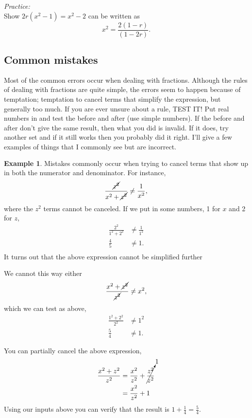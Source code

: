\documentclass[final,a4paper,12pt]{article}
\theoremstyle{definition}
\newtheorem{example}{Example}[section]
\begin{document}
{\it Practice:} \\
Show $2 r (x^2 - 1) = x^2 - 2$ can be written as
\begin{equation}
    x^2 = \frac{2(1 - r)}{(1 - 2r)} .
\end{equation}

\subsection{Common mistakes}
Most of the common errors occur when dealing with fractions.  Although the rules
of dealing with fractions are quite simple, the errors seem to happen because of
temptation; temptation to cancel terms that simplify the expression, but
generally too much.  If you are ever unsure about a rule, TEST IT!  Put real
numbers in and test the before and after (use simple numbers).  If the before
and after don't give the same result, then what you did is invalid.  If it does,
try another set and if it still works then you probably did it right.  I'll give
a few examples of things that I commonly see but are incorrect.

\begin{example}
    Mistakes commonly occur when trying to cancel terms that show up in both the
    numerator and denominator.  For instance,
    \begin{equation*}
        \frac{\cancel{z^2}}{x^2 + \cancel{z^2}} \neq \frac{1}{x^2} ,
    \end{equation*}
    where the $z^2$ terms cannot be canceled.  If we put in some numbers, 1 for
    $x$ and 2 for $z$,
    \begin{align*}
        \frac{2^2}{1^2 + 2^2} &\neq \frac{1}{1^2} \\
        \frac{4}{5} &\neq 1 .\\
    \end{align*}
    It turns out that the above expression cannot be simplified further
    
    We cannot this way either
    \begin{equation*}
        \frac{x^2 + \cancel{z^2}}{\cancel{z^2}} \neq x^2 ,
    \end{equation*}
    which we can test as above,
    \begin{align*}
        \frac{1^2 + 2^2}{2^2} &\neq 1^2 \\
        \frac{5}{4} &\neq 1 .
    \end{align*}

    You can partially cancel the above expression,
    \begin{align*}
        \frac{x^2 + z^2}{z^2} &= \frac{x^2}{z^2} + \cancelto{1}{\frac{z^2}{z^2}} \\
        &= \frac{x^2}{z^2} + 1 \\
    \end{align*}
    Using our inputs above you can verify that the result is $1+\frac{1}{4} =
    \frac{5}{4}$.
\end{example}
\end{document}
